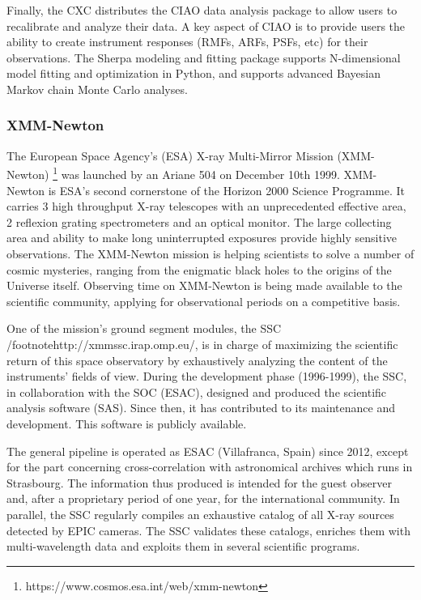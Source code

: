 \documentclass[11pt,a4paper]{ivoa}
\begin{document}
Finally, the CXC distributes the CIAO data analysis package to allow users to recalibrate and analyze their data. A key
aspect of CIAO is to provide users the ability to create instrument responses (RMFs, ARFs, PSFs, etc) for their
observations. The Sherpa modeling and fitting package supports N-dimensional model fitting and optimization in Python,
and supports advanced Bayesian Markov chain Monte Carlo analyses.

\subsubsection{XMM-Newton}

The European Space Agency's (ESA) X-ray Multi-Mirror Mission (XMM-Newton) \footnote{https://www.cosmos.esa.int/web/xmm-newton}
was launched by an Ariane 504 on December 10th 1999. XMM-Newton is ESA's second cornerstone of the Horizon 2000 Science Programme.
It carries 3 high throughput X-ray telescopes with an unprecedented effective area, 2 reflexion grating spectrometers and an optical monitor. 
The large collecting area and ability to make long uninterrupted exposures provide highly sensitive observations.
The XMM-Newton mission is helping scientists to solve a number of cosmic mysteries, ranging from the enigmatic black holes
to the origins of the Universe itself. Observing time on XMM-Newton is being made available to the scientific community,
applying for observational periods on a competitive basis.

One of the mission's ground segment modules, the SSC /footnote{http://xmmssc.irap.omp.eu/}, is in charge of maximizing the scientific return of
this space observatory by exhaustively analyzing
the content of the instruments' fields of view. During the development phase (1996-1999), the SSC,
in collaboration with the SOC (ESAC), designed and produced the scientific analysis software (SAS).
Since then, it has contributed to its maintenance and development. This software is publicly available.

The general pipeline is operated as ESAC (Villafranca, Spain) since 2012, except for the part concerning cross-correlation
with astronomical archives which runs in Strasbourg.
The information thus produced is intended for the guest observer and, after a proprietary period of one year,
for the international community. 
In parallel, the SSC regularly compiles an exhaustive catalog of all X-ray sources detected by EPIC cameras.
The SSC validates these catalogs, enriches them with multi-wavelength data and exploits them in several scientific programs.  
\end{document}
